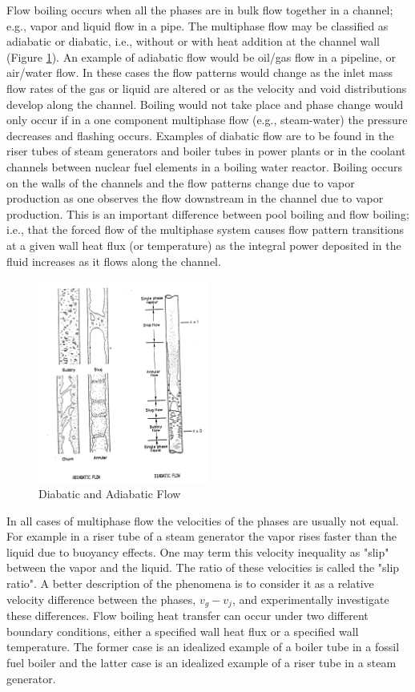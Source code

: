 Flow boiling occurs when all the phases are in bulk flow together in a channel; e.g., vapor and liquid flow in a pipe.
The multiphase flow may be classified as adiabatic or diabatic, i.e., without or with heat addition at the channel wall (Figure \ref{fig:flow_boiling}).
An example of adiabatic flow would be oil/gas flow in a pipeline, or air/water flow.
In these cases the flow patterns would change as the inlet mass flow rates of the gas or liquid are altered or as the velocity and void distributions develop along the channel.
Boiling would not take place and phase change would only occur if in a one component multiphase flow (e.g., steam-water) the pressure decreases and flashing occurs.
Examples of diabatic flow are to be found in the riser tubes of steam generators and boiler tubes in power plants or in the coolant channels between nuclear fuel elements in a boiling water reactor.
Boiling occurs on the walls of the channels and the flow patterns change due to vapor production as one observes the flow downstream in the channel due to vapor production.
This is an important difference between pool boiling and flow boiling; i.e., that the forced flow of the multiphase system causes flow pattern transitions at a given wall heat flux (or temperature) as the integral power deposited in the fluid increases as it flows along the channel.

\begin{figure}[h]
\includegraphics[width=0.5\textwidth]{images/flow_boiling.png}
\caption{Diabatic and Adiabatic Flow}
\label{fig:flow_boiling}
\end{figure}

In all cases of multiphase flow the velocities of the phases are usually not equal.
For example in a riser tube of a steam generator the vapor rises faster than the liquid due to buoyancy effects.
One may term this velocity inequality as "slip" between the vapor and the liquid.
The ratio of these velocities is called the "slip ratio".
A better description of the phenomena is to consider it as a relative velocity difference between the phases, $v_g - v_j$, and experimentally investigate these differences.
Flow boiling heat transfer can occur under two different boundary conditions, either a specified wall heat flux or a specified wall temperature.
The former case is an idealized example of a boiler tube in a fossil fuel boiler and the latter case is an idealized example of a riser tube in a steam generator.

